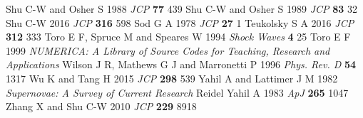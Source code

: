 \documentclass[letterpaper]{jpconf}
\begin{document}
\begin{thebibliography}{36}
   Shu C-W and Osher S 1988 {\it JCP} {\bf 77} 439
   Shu C-W and Osher S 1989 {\it JCP} {\bf 83} 32
   Shu C-W 2016 {\it JCP} {\bf 316} 598
   Sod G A 1978 {\it JCP} {\bf 27} 1
   Teukolsky S A 2016 {\it JCP} {\bf 312} 333
   Toro E F, Spruce M and Speares W 1994 {\it Shock Waves} {\bf 4} 25
   Toro E F 1999 {\it NUMERICA: A Library of Source Codes for Teaching, Research and Applications}
   Wilson J R, Mathews G J and Marronetti P 1996 {\it Phys. Rev. D} {\bf 54} 1317
   Wu K and Tang H 2015 {\it JCP} {\bf 298} 539
   Yahil A and Lattimer J M 1982 {\it Supernovae: A Survey of Current Research} Reidel
   Yahil A 1983 {\it ApJ} {\bf 265} 1047
   Zhang X and Shu C-W 2010 {\it JCP} {\bf 229} 8918
\end{thebibliography}
\end{document}
